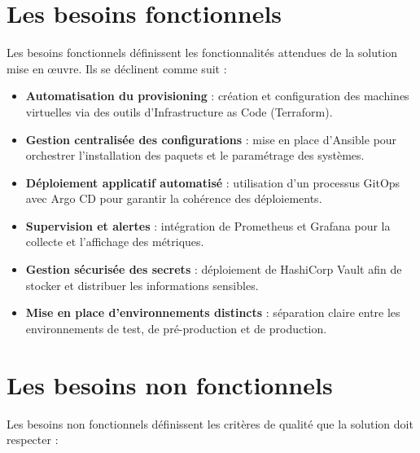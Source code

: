 \section{Les besoins fonctionnels}

Les besoins fonctionnels définissent les fonctionnalités attendues de la solution mise en œuvre. Ils se déclinent comme suit :

\begin{itemize}
    \item \textbf{Automatisation du provisioning} : création et configuration des machines virtuelles via des outils d'Infrastructure as Code (Terraform).
    \item \textbf{Gestion centralisée des configurations} : mise en place d'Ansible pour orchestrer l'installation des paquets et le paramétrage des systèmes.
    \item \textbf{Déploiement applicatif automatisé} : utilisation d'un processus GitOps avec Argo CD pour garantir la cohérence des déploiements.
    \item \textbf{Supervision et alertes} : intégration de Prometheus et Grafana pour la collecte et l'affichage des métriques.
    \item \textbf{Gestion sécurisée des secrets} : déploiement de HashiCorp Vault afin de stocker et distribuer les informations sensibles.
    \item \textbf{Mise en place d'environnements distincts} : séparation claire entre les environnements de test, de pré-production et de production.
\end{itemize}

\section{Les besoins non fonctionnels}

Les besoins non fonctionnels définissent les critères de qualité que la solution doit respecter :


